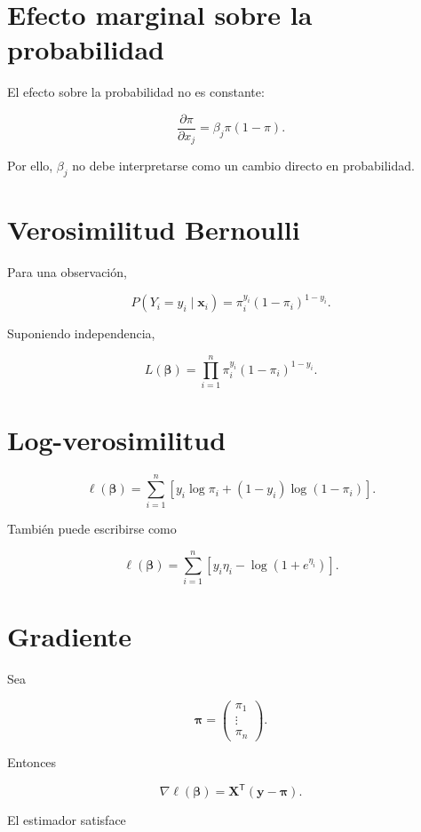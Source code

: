 \documentclass[
  spanish,
  11pt,
  letterpaper,
  DIV=11,
  numbers=noendperiod]{scrreprt}
\theoremstyle{definition}
\theoremstyle{plain}
\theoremstyle{definition}
\theoremstyle{remark}
\begin{document}
\section{Efecto marginal sobre la
probabilidad}\label{efecto-marginal-sobre-la-probabilidad}

El efecto sobre la probabilidad no es constante:

\[
\frac{\partial\pi}{\partial x_j}
=
\beta_j\pi(1-\pi).
\]

Por ello, \(\beta_j\) no debe interpretarse como un cambio directo en
probabilidad.

\section{Verosimilitud Bernoulli}\label{verosimilitud-bernoulli}

Para una observación,

\[
P(Y_i=y_i\mid\mathbf{x}_i)
=
\pi_i^{y_i}(1-\pi_i)^{1-y_i}.
\]

Suponiendo independencia,

\[
L(\boldsymbol{\beta})
=
\prod_{i=1}^{n}
\pi_i^{y_i}(1-\pi_i)^{1-y_i}.
\]

\section{Log-verosimilitud}\label{log-verosimilitud-1}

\[
\ell(\boldsymbol{\beta})
=
\sum_{i=1}^{n}
\left[
y_i\log\pi_i
+
(1-y_i)\log(1-\pi_i)
\right].
\]

También puede escribirse como

\[
\ell(\boldsymbol{\beta})
=
\sum_{i=1}^{n}
\left[
y_i\eta_i
-
\log(1+e^{\eta_i})
\right].
\]

\section{Gradiente}\label{gradiente-1}

Sea

\[
\boldsymbol{\pi}
=
\begin{pmatrix}
\pi_1\\
\vdots\\
\pi_n
\end{pmatrix}.
\]

Entonces

\[
\nabla\ell(\boldsymbol{\beta})
=
\mathbf{X}^{\mathsf T}
(\mathbf{y}-\boldsymbol{\pi}).
\]

El estimador satisface
\end{document}
